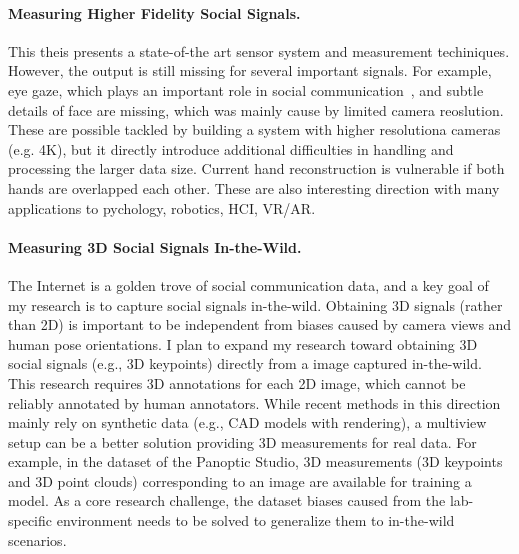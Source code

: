 \paragraph{Measuring Higher Fidelity Social Signals.}
This theis presents a state-of-the art sensor system and measurement techiniques. However, the output is still missing for several important signals. For example, eye gaze, which plays an important role in social communication~\cite{rayner1998eye,friesen1998eyes,ricciardelli2002my}, and subtle details of face are missing, which was mainly cause by limited camera reoslution. These are possible tackled by building a system with higher resolutiona cameras (e.g. 4K), but it directly introduce additional difficulties in handling and processing the larger data size. Current hand reconstruction is vulnerable if both hands are overlapped each other. These are also interesting direction with many applications to pychology, robotics, HCI, VR/AR. 


\paragraph{Measuring 3D Social Signals In-the-Wild.}
The Internet is a golden trove of social communication data, and a key goal of my research is to capture social signals in-the-wild. Obtaining 3D signals (rather than 2D) is important to be independent from biases caused by camera views and human pose orientations. I plan to expand my research toward obtaining 3D social signals (e.g., 3D keypoints) directly from a image captured in-the-wild. This research requires 3D annotations for each 2D image, which cannot be reliably annotated by human annotators. While recent methods in this direction mainly rely on synthetic data (e.g., CAD models with rendering), a multiview setup can be a better solution providing 3D measurements for real data. For example, in the dataset of the Panoptic Studio, 3D measurements (3D keypoints and 3D point clouds) corresponding to an image are available for training a model. As a core research challenge, the dataset biases caused from the lab-specific environment needs to be solved to generalize them to in-the-wild scenarios. 


